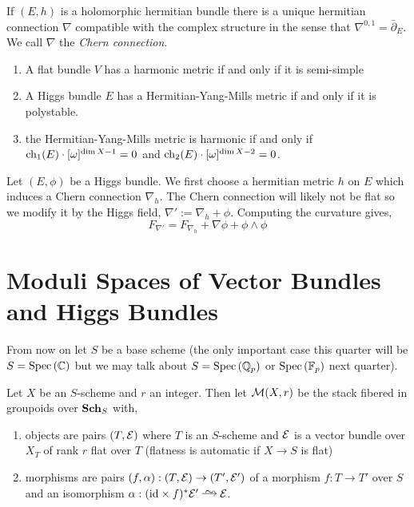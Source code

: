 \documentclass[12pt]{article}
\begin{document}
\begin{theorem}
If $(E, h)$ is a holomorphic hermitian bundle there is a unique hermitian connection $\nabla$ compatible with the complex structure in the sense that $\nabla^{0,1} = \bar{\partial}_E$. We call $\nabla$ the \textit{Chern connection}.
\end{theorem}



\begin{theorem}
\begin{enumerate}
\item A flat bundle $V$ has a harmonic metric if and only if it is semi-simple
\item A Higgs bundle $E$ has a Hermitian-Yang-Mills metric if and only if it is polystable. 
\item the Hermitian-Yang-Mills metric is harmonic if and only if $\mathrm{ch}_1(E) \cdot [\omega]^{\dim{X}-1} = 0$ and $\mathrm{ch}_2(E) \cdot [\omega]^{\dim{X}-2} = 0$.
\end{enumerate}
\end{theorem}

Let $(E, \phi)$ be a Higgs bundle. We first choose a hermitian metric $h$ on $E$ which induces a Chern connection $\nabla_h$. The Chern connection will likely not be flat so we modify it by the Higgs field, $\nabla' := \nabla_h + \phi$. Computing the curvature gives,
\[ F_{\nabla'} = F_{\nabla_h} + \nabla \phi + \phi \wedge \phi \]

\section{Moduli Spaces of Vector Bundles and Higgs Bundles}

\newcommand{\Isom}{\mathrm{Isom}}

From now on let $S$ be a base scheme (the only important case this quarter will be $S = \mathrm{Spec}\left( \mathbb{C} \right)$ but we may talk about $S = \mathrm{Spec}\left( \mathbb{Q}_p \right)$ or $\mathrm{Spec}\left( \mathbb{F}_p \right)$ next quarter).

\begin{defn}
Let $X$ be an $S$-scheme and $r$ an integer. Then let $\mathcal{M}(X, r)$ be the stack fibered in groupoids over $\mathbf{Sch}_S$ with,
\begin{enumerate}
\item objects are pairs $(T, \mathcal{E})$ where $T$ is an $S$-scheme and $\mathcal{E}$ is a vector bundle over $X_T$ of rank $r$ flat over $T$ (flatness is automatic if $X \to S$ is flat)
\item morphisms are pairs $(f, \alpha) : (T, \mathcal{E}) \to (T', \mathcal{E}')$ of a morphism $f : T \to T'$ over $S$ and an isomorphism $\alpha : (\id \times f)^* \E' \iso \E$.
\end{enumerate} 
\end{defn}
\end{document}
